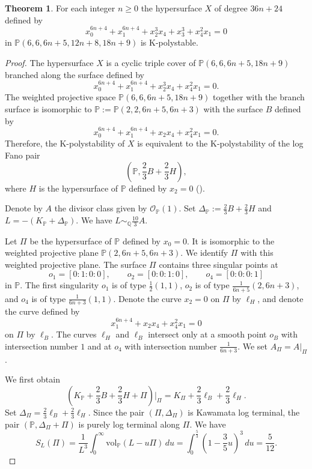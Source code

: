 \documentclass[12pt]{amsart}
\theoremstyle{definition}
\newtheorem{theorem}[equation]{Theorem}
\theoremstyle{remark}
\begin{document}
\begin{theorem} \label{theorem:g}
For each integer $n\geq 0$
the hypersurface $X$ of degree $36n+24$  defined by 
\[x_0^{6n+4}+x_1^{6n+4}+x_2^{3}x_4+x_3^3+x_4^2x_1=0\]
in $\mathbb{P}(6,6,6n+5,12n+8,18n+9)$
is K-polystable.
\end{theorem}
\begin{proof}
The hypersurface  $X$ is a cyclic triple  cover of $\mathbb{P}(6,6,6n+5,18n+9)$ branched along the surface defined by
\[x_0^{6n+4}+x_1^{6n+4}+x_2^{3}x_4+x_4^2x_1=0.\]
The weighted projective space $\mathbb{P}(6,6,6n+5,18n+9)$ together with the branch surface is isomorphic to $\mathbb{P}:=\mathbb{P}(2,2,6n+5,6n+3)$ with the surface $B$
defined by
\[x_0^{6n+4}+x_1^{6n+4}+x_2x_4+x_4^2x_1=0.\]
Therefore, the K-polystability of $X$ is equivalent to the K-polystability of the log Fano pair
$$\left(\mathbb{P}, \frac{2}{3}B+\frac{2}{3}H\right),$$ where $H$ is the hypersurface  of $\mathbb{P}$ defined by $x_2=0$ (\cite[Theorem~1.2]{LZ22}).



Denote by $A$ the divisor  class given by $\mathcal{O}_\mathbb{P}(1)$.
Set $\Delta_\mathbb{P} :=\frac{2}{3}B+\frac{2}{3}H$ and $L=-\left(K_\mathbb{P}+\Delta_\mathbb{P}\right)$.  We have $L\sim_\mathbb{Q} \frac{10}{3}A$.

Let $\Pi$ be the hypersurface of $\mathbb{P}$ defined by $x_0=0$. It is isomorphic to the weighted projective plane 
$\mathbb{P}(2,6n+5,6n+3)$. We identify $\Pi$ with this weighted projective plane.
The surface $\Pi$ contains three singular points at 
\[
o_1=[0:1:0:0], \qquad
o_2=[0:0:1:0], \qquad
o_4=[0:0:0:1]
\]
in $\mathbb{P}$.
The first singularity $o_1$ is of type $\frac{1}{2}(1,1)$, $o_2$ is of type
$\frac{1}{6n+5}(2,6n+3)$, and $o_4$ is of type $\frac{1}{6n+3}(1,1)$.
 Denote the curve $x_2=0$ on $\Pi$ by $\ell_H$, and denote the curve defined
 by 
 \[x_1^{6n+4}+x_2x_4+x_4^2x_1=0\]
 on $\Pi$ by $\ell_B$.
 The curves $\ell_H$ and $\ell_B$ intersect only at  a smooth point $o_B$ with intersection number $1$ and at $o_4$ with intersection number $\frac{1}{6n+3}$. We set $A_\Pi=A|_\Pi$.
 
 We first  obtain
 \[\left(K_\mathbb{P}+\frac{2}{3}B+\frac{2}{3}H+\Pi\right)\Big|_\Pi=K_\Pi+\frac{2}{3}\ell_B+\frac{2}{3}\ell_H.\]
Set $\Delta_\Pi=\frac{2}{3}\ell_B+\frac{2}{3}\ell_H$.
Since the pair $(\Pi, \Delta_\Pi)$ is Kawamata log terminal, the pair $(\mathbb{P},\Delta_\Pi+\Pi)$ is purely log terminal along $\Pi$.
We have
\[
S_L(\Pi) =\frac{1}{L^3} \int_0^{\infty} \mathrm{vol}_\mathbb{P}(L - u \Pi) \,du=
\int_0^{\frac{5}{3}}  \left(1 - \frac{3}{5} u\right)^3 \,du=\frac{5}{12}.
\]



\end{proof}
\end{document}
